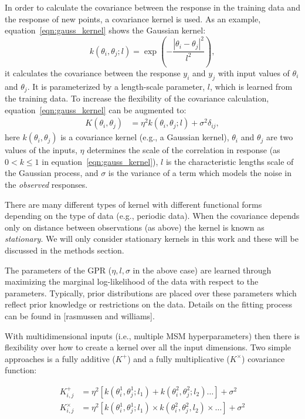 In order to calculate the covariance between the response in the training data and the response of new points, a covariance kernel is used. As an example, equation~\ref{eqn:gauss_kernel} shows the Gaussian kernel: 
\begin{equation}
    k(\theta_i, \theta_j; l) =  \exp\left(-\frac{\left|\theta_i-\theta_j\right|^2}{l^2}\right), \label{eqn:gauss_kernel}
\end{equation}
it calculates the covariance between the response $y_i$ and $y_j$ with input values of $\theta_i$ and $\theta_j$. It is parameterized by a length-scale parameter, $l$, which is learned from the training data. To increase the flexibility of the covariance calculation, equation~\ref{eqn:gauss_kernel} can be augmented to: 
\begin{align}
    K(\theta_i, \theta_j) & = \eta^2  k(\theta_i, \theta_j; l) + \sigma^2\delta_{ij}, 
\end{align}
here $k(\theta_i, \theta_j)$ is a covariance kernel (e.g., a Gaussian kernel),  $\theta_i$ and $\theta_j$ are two values of the inputs, $\eta$ determines the scale of the correlation in response (as $0<k\le 1$ in equation~\ref{eqn:gauss_kernel}), $l$ is the characteristic lengths scale of the Gaussian process, and $\sigma$ is the variance of a term which models the noise in the \emph{observed} responses. 

There are many different types of kernel with different functional forms depending on the type of data (e.g., periodic data). When the covariance depends only on distance between observations (as above) the kernel is known as \emph{stationary}.  We will only consider stationary kernels in this work and these will be discussed in the methods section. 

The parameters of the GPR ($\eta, l, \sigma$ in the above case) are learned through maximizing the marginal log-likelihood of the data with respect to the parameters. Typically, prior distributions are placed over these parameters which reflect prior knowledge or restrictions on the data. Details on the fitting process can be found in [rasmussen and williams]. 

With multidimensional inputs (i.e., multiple MSM hyperparameters) then there is flexibility over how to create a kernel over all the input dimensions. Two simple approaches is a fully additive ($K^{\mathrm{+}}$) and a fully multiplicative ($K^{\mathrm{\times}}$) covariance function: 

\begin{align}
    K^{\mathrm{+}}_{i,j} & = \eta^2  \left [k(\theta^{1}_i, \theta^{1}_j; l_{1}) + k(\theta^{2}_i, \theta^{2}_j; l_{2}) \ldots \right ] + \sigma^2  \label{eqn:plus_kernel} \\ 
    K^{\mathrm{\times}}_{i,j} & = \eta^2  \left [k(\theta^{1}_i, \theta^{1}_j; l_{1}) \times k(\theta^{2}_i, \theta^{2}_j, l_{2}) \times \ldots \right ] + \sigma^2 \label{eqn:mult_kernel}
\end{align}

